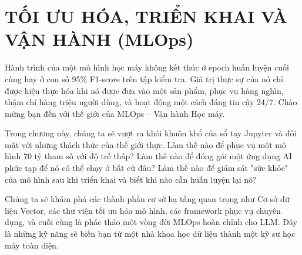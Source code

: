 
\chapter{TỐI ƯU HÓA, TRIỂN KHAI VÀ VẬN HÀNH (MLOps)}
\label{chap:mlops}

Hành trình của một mô hình học máy không kết thúc ở epoch huấn luyện cuối cùng hay ở con số 95\% F1-score trên tập kiểm tra. Giá trị thực sự của nó chỉ được hiện thực hóa khi nó được đưa vào một sản phẩm, phục vụ hàng nghìn, thậm chí hàng triệu người dùng, và hoạt động một cách đáng tin cậy 24/7. Chào mừng bạn đến với thế giới của MLOps -- Vận hành Học máy.

Trong chương này, chúng ta sẽ vượt ra khỏi khuôn khổ của sổ tay Jupyter và đối mặt với những thách thức của thế giới thực. Làm thế nào để phục vụ một mô hình 70 tỷ tham số với độ trễ thấp? Làm thế nào để đóng gói một ứng dụng AI phức tạp để nó có thể chạy ở bất cứ đâu? Làm thế nào để giám sát "sức khỏe" của mô hình sau khi triển khai và biết khi nào cần huấn luyện lại nó?

Chúng ta sẽ khám phá các thành phần cơ sở hạ tầng quan trọng như Cơ sở dữ liệu Vector, các thư viện tối ưu hóa mô hình, các framework phục vụ chuyên dụng, và cuối cùng là phác thảo một vòng đời MLOps hoàn chỉnh cho LLM. Đây là những kỹ năng sẽ biến bạn từ một nhà khoa học dữ liệu thành một kỹ sư học máy toàn diện.